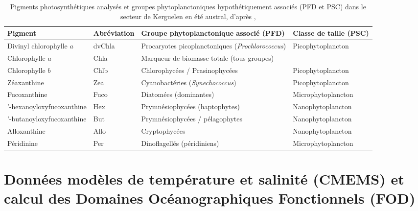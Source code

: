  	\begin{table}[H]
 		\centering
 		\renewcommand{\arraystretch}{1.3}
 		\begin{tabular}{
 				>{\raggedright\arraybackslash}p{3.4cm}
 				>{\raggedright\arraybackslash}p{2.0cm}
 				>{\raggedright\arraybackslash}p{4.8cm}
 				>{\raggedright\arraybackslash}p{2.6cm}
 			}
 			\hline
 			\textbf{Pigment} & \textbf{Abréviation} & \textbf{Groupe phytoplanctonique associé (PFD)} & \textbf{Classe de taille (PSC)} \\
 			\hline
 			Divinyl chlorophylle $a$ & dvChla & Procaryotes picoplanctoniques (\textit{Prochlorococcus}) & Picophytoplancton \\
 			Chlorophylle $a$ & Chla & Marqueur de biomasse totale (tous groupes) & -- \\
 			Chlorophylle $b$ & Chlb & Chlorophycées / Prasinophycées & Picophytoplancton \\
 			Zéaxanthine & Zea & Cyanobactéries (\textit{Synechococcus}) & Picophytoplancton \\
 			Fucoxanthine & Fuco & Diatomées (dominantes) & Microphytoplancton \\
 			19'-hexanoyloxyfucoxanthine & Hex & Prymnésiophycées (haptophytes) & Nanophytoplancton \\
 			19'-butanoyloxyfucoxanthine & But & Prymnésiophycées / pélagophytes & Nanophytoplancton \\
 			Alloxanthine & Allo & Cryptophycées & Nanophytoplancton \\
 			Péridinine & Per & Dinoflagellés (péridiniens) & Microphytoplancton \\
 			\hline
 		\end{tabular}
 		\renewcommand{\arraystretch}{1}
 		\caption{Pigments photosynthétiques analysés et groupes phytoplanctoniques hypothétiquement associés (PFD et PSC) dans le secteur de Kerguelen en été austral, d'après \cite{Lasbleiz2014}, \cite{sari2025influence}}
 		\label{tab:corresp_pig}
 	\end{table}
 
 \section{Données modèles de température et salinité (CMEMS) et calcul des Domaines Océanographiques Fonctionnels (FOD)}
